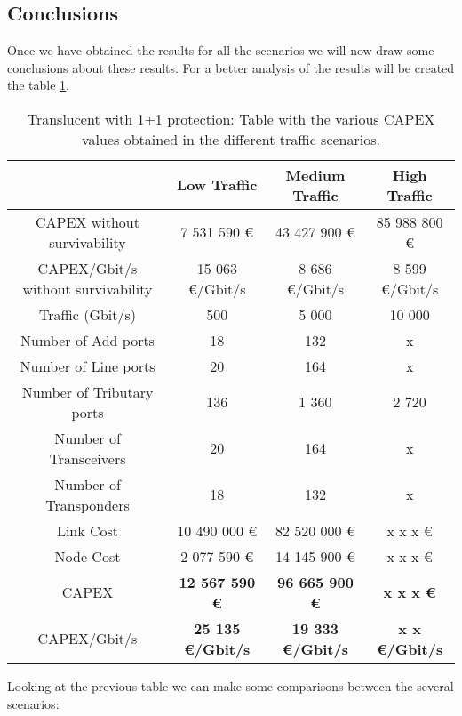 \clearpage
\subsection{Conclusions}

Once we have obtained the results for all the scenarios we will now draw some conclusions about these results. For a better analysis of the results will be created the table \ref{table_comparative_transluc_protec}.

\begin{table}[h!]
\centering
\begin{tabular}{| c | c | c | c |}
 \hline
  & Low Traffic & Medium Traffic  & High Traffic \\
 \hline\hline
 CAPEX without survivability&7 531 590 \euro&43 427 900 \euro&85 988 800 \euro\\ \hline
 CAPEX/Gbit/s without survivability&15 063 \euro/Gbit/s& 8 686 \euro/Gbit/s&8 599 \euro/Gbit/s\\ \hline
 Traffic (Gbit/s) & 500 & 5 000 & 10 000 \\ \hline
 Number of Add ports & 18 & 132 & x \\ \hline
 Number of Line ports & 20 & 164 & x \\ \hline
 Number of Tributary ports & 136 & 1 360 & 2 720 \\ \hline
 Number of Transceivers & 20 & 164 & x \\ \hline
 Number of Transponders & 18 & 132 & x \\ \hline
 Link Cost & 10 490 000 \euro & 82 520 000 \euro & x x x \euro \\ \hline
 Node Cost & 2 077 590 \euro & 14 145 900 \euro & x x x \euro \\ \hline
 CAPEX & \textbf{12 567 590 \euro} & \textbf{96 665 900 \euro} & \textbf{x x x \euro} \\ \hline
 CAPEX/Gbit/s & \textbf{25 135 \euro/Gbit/s} & \textbf{19 333 \euro/Gbit/s} & \textbf{x x \euro/Gbit/s}\\
 \hline
\end{tabular}
\caption{Translucent with 1+1 protection: Table with the various CAPEX values obtained in the different traffic scenarios.}
\label{table_comparative_transluc_protec}
\end{table}

Looking at the previous table we can make some comparisons between the several scenarios:

